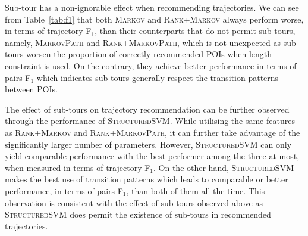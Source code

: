 Sub-tour has a non-ignorable effect when recommending trajectories.
We can see from Table~\ref{tab:f1} that both \textsc{Markov} and \textsc{Rank+Markov} always perform worse,
in terms of trajectory F$_1$, than
their counterparts that do not permit sub-tours, namely, \textsc{MarkovPath} and \textsc{Rank+MarkovPath},
which is not unexpected as sub-tours worsen the proportion of correctly
recommended POIs when length constraint is used.
On the contrary, they achieve better performance in terms of pairs-F$_1$ which indicates sub-tours generally
respect the transition patterns between POIs.

The effect of sub-tours on trajectory recommendation can be further observed through the performance of \textsc{StructuredSVM}.
%
While utilising the same features as \textsc{Rank+Markov} and \textsc{Rank+MarkovPath},
it can further take advantage of the significantly larger number of parameters.
However, \textsc{StructuredSVM} can only yield comparable performance with the best performer 
among the three at most, when measured in terms of trajectory F$_1$.
On the other hand, \textsc{StructuredSVM} makes the best use of transition patterns which leads to comparable or
better performance, in terms of pairs-F$_1$, than both of them all the time.
This observation is consistent with the effect of sub-tours observed above
as \textsc{StructuredSVM} does permit the existence of sub-tours in recommended trajectories.

